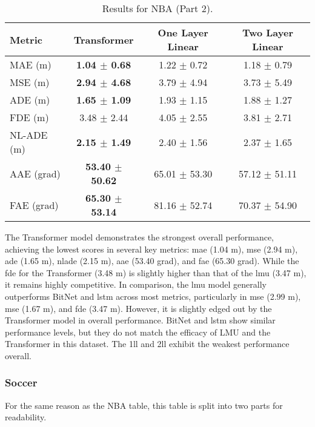\begin{table}[H]
\centering
\caption{Results for NBA (Part 2).}
\label{init: NBA2}
\begin{tabular}{l||c|c|c}
Metric & Transformer & One Layer Linear & Two Layer Linear \\
\hline \hline
MAE (m) & \textbf{1.04 $\pm$ 0.68} & 1.22 $\pm$ 0.72 & 1.18 $\pm$ 0.79 \\
MSE (m) & \textbf{2.94 $\pm$ 4.68} & 3.79 $\pm$ 4.94 & 3.73 $\pm$ 5.49 \\
ADE (m) & \textbf{1.65 $\pm$ 1.09} & 1.93 $\pm$ 1.15 & 1.88 $\pm$ 1.27 \\
FDE (m) & 3.48 $\pm$ 2.44 & 4.05 $\pm$ 2.55 & 3.81 $\pm$ 2.71 \\
NL-ADE (m) & \textbf{2.15 $\pm$ 1.49} & 2.40 $\pm$ 1.56 & 2.37 $\pm$ 1.65 \\
AAE (grad) & \textbf{53.40 $\pm$ 50.62} & 65.01 $\pm$ 53.30 & 57.12 $\pm$ 51.11 \\
FAE (grad) & \textbf{65.30 $\pm$ 53.14} & 81.16 $\pm$ 52.74 & 70.37 $\pm$ 54.90 \\
\end{tabular}
\end{table}

The Transformer model demonstrates the strongest overall performance, achieving the lowest scores in several key metrics: \gls{mae} (1.04 m), \gls{mse} (2.94 m), \gls{ade} (1.65 m), \gls{nlade} (2.15 m), \gls{aae} (53.40 grad), and \gls{fae} (65.30 grad). While the \gls{fde} for the Transformer (3.48 m) is slightly higher than that of the \gls{lmu} (3.47 m), it remains highly competitive. In comparison, the \gls{lmu} model generally outperforms BitNet and \gls{lstm} across most metrics, particularly in \gls{mse} (2.99 m), \gls{mse} (1.67 m), and \gls{fde} (3.47 m). However, it is slightly edged out by the Transformer model in overall performance. BitNet and \gls{lstm} show similar performance levels, but they do not match the efficacy of LMU and the Transformer in this dataset. The \gls{1ll} and \gls{2ll} exhibit the weakest performance overall.

\subsubsection{Soccer}
For the same reason as the NBA table, this table is split into two parts for readability.


